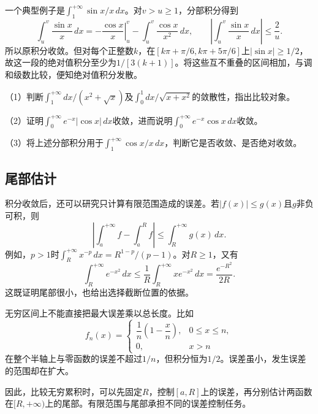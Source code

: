 一个典型例子是\(\int_1^{+\infty}\sin x/x\,dx\)。对\(v>u\ge1\)，分部积分得到
\begin{equation*}
 \int_u^v\frac{\sin x}{x}\,dx
 =\left.-\frac{\cos x}{x}\right|_u^v-\int_u^v\frac{\cos x}{x^2}\,dx,
 \qquad
 \left|\int_u^v\frac{\sin x}{x}\,dx\right|\le\frac2u.
\end{equation*}
所以原积分收敛。但对每个正整数\(k\)，在\([k\pi+\pi/6,k\pi+5\pi/6]\)上\(|\sin x|\ge1/2\)，故这一段的绝对值积分至少为\(1/[3(k+1)]\)。将这些互不重叠的区间相加，与调和级数比较，便知绝对值积分发散。

\begin{exercise}
\mbox{}\par\nobreak

（1）判断\(\int_1^{+\infty}dx/(x^2+\sqrt{x})\)及\(\int_0^1dx/\sqrt{x+x^2}\)的敛散性，指出比较对象。

（2）证明\(\int_0^{+\infty}e^{-x}|\cos x|\,dx\)收敛，进而说明\(\int_0^{+\infty}e^{-x}\cos x\,dx\)收敛。

（3）将上述分部积分用于\(\int_1^{+\infty}\cos x/x\,dx\)，判断它是否收敛、是否绝对收敛。
\end{exercise}

\subsection{尾部估计}

积分收敛后，还可以研究只计算有限范围造成的误差。若\(|f(x)|\le g(x)\)且\(g\)非负可积，则
\begin{equation*}
 \left|\int_a^{+\infty}f-\int_a^Rf\right|
 \le\int_R^{+\infty}g(x)\,dx.
\end{equation*}
例如，\(p>1\)时\(\int_R^{+\infty}x^{-p}\,dx=R^{1-p}/(p-1)\)。对\(R\ge1\)，又有
\begin{equation*}
 \int_R^{+\infty}e^{-x^2}\,dx
 \le\frac1R\int_R^{+\infty}xe^{-x^2}\,dx
 =\frac{e^{-R^2}}{2R}.
\end{equation*}
这既证明尾部很小，也给出选择截断位置的依据。

无穷区间上不能直接把最大误差乘以总长度。比如
\begin{equation*}
 f_n(x)=\begin{cases}\dfrac1n\left(1-\dfrac xn\right),&0\le x\le n,\\0,&x>n\end{cases}
\end{equation*}
在整个半轴上与零函数的误差不超过\(1/n\)，但积分恒为\(1/2\)。误差虽小，发生误差的范围却在扩大。

因此，比较无穷累积时，可以先固定\(R\)，控制\([a,R]\)上的误差，再分别估计两函数在\([R,+\infty)\)上的尾部。有限范围与尾部承担不同的误差控制任务。

